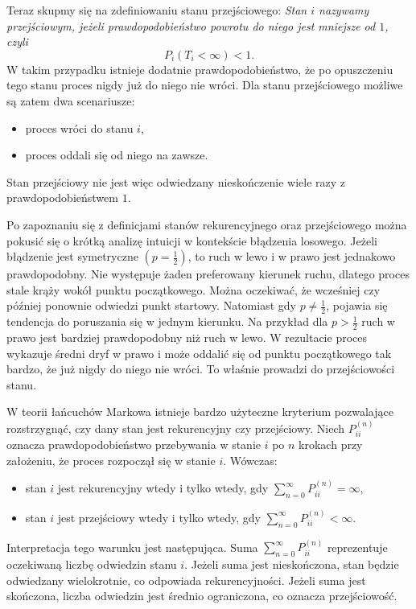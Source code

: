 Teraz skupmy się na zdefiniowaniu stanu przejściowego:\newline
\textit{Stan $i$ nazywamy przejściowym, jeżeli prawdopodobieństwo powrotu do niego jest mniejsze od $1$, czyli}
$$P_i(T_i<\infty)<1.$$
W takim przypadku istnieje dodatnie prawdopodobieństwo, że po opuszczeniu tego stanu proces nigdy już do niego nie wróci. Dla stanu przejściowego możliwe są zatem dwa scenariusze:
\begin{itemize}
    \item proces wróci do stanu $i$,
    \item proces oddali się od niego na zawsze.
\end{itemize}
Stan przejściowy nie jest więc odwiedzany nieskończenie wiele razy z prawdopodobieństwem $1$.

Po zapoznaniu się z definicjami stanów rekurencyjnego oraz przejściowego można pokusić się o krótką analizę intuicji w kontekście błądzenia losowego. Jeżeli błądzenie jest symetryczne $(p=\frac{1}{2})$, to ruch w lewo i w prawo jest jednakowo prawdopodobny. Nie występuje żaden preferowany kierunek ruchu, dlatego proces stale krąży wokół punktu początkowego. Można oczekiwać, że wcześniej czy później ponownie odwiedzi punkt startowy. Natomiast gdy $p\neq \frac{1}{2}$, pojawia się tendencja do poruszania się w jednym kierunku. Na przykład dla $p>\frac{1}{2}$ ruch w prawo jest bardziej prawdopodobny niż ruch w lewo. W rezultacie proces wykazuje średni dryf w prawo i może oddalić się od punktu początkowego tak bardzo, że już nigdy do niego nie wróci. To właśnie prowadzi do przejściowości stanu.

W teorii łańcuchów Markowa istnieje bardzo użyteczne kryterium pozwalające rozstrzygnąć, czy dany stan jest rekurencyjny czy przejściowy. Niech $P_{ii}^{(n)}$ oznacza prawdopodobieństwo przebywania w stanie $i$ po $n$ krokach przy założeniu, że proces rozpoczął się w stanie $i$. Wówczas:
\begin{itemize}
    \item stan $i$ jest rekurencyjny wtedy i tylko wtedy, gdy $\sum_{n=0}^{\infty}P_{ii}^{(n)}=\infty$,
    \item stan $i$ jest przejściowy wtedy i tylko wtedy, gdy $\sum_{n=0}^{\infty}P_{ii}^{(n)}<\infty$.
\end{itemize}
Interpretacja tego warunku jest następująca. Suma $\sum_{n=0}^{\infty}P_{ii}^{(n)}$ reprezentuje oczekiwaną liczbę odwiedzin stanu $i$. Jeżeli suma jest nieskończona, stan będzie odwiedzany wielokrotnie, co odpowiada rekurencyjności. Jeżeli suma jest skończona, liczba odwiedzin jest średnio ograniczona, co oznacza przejściowość.

